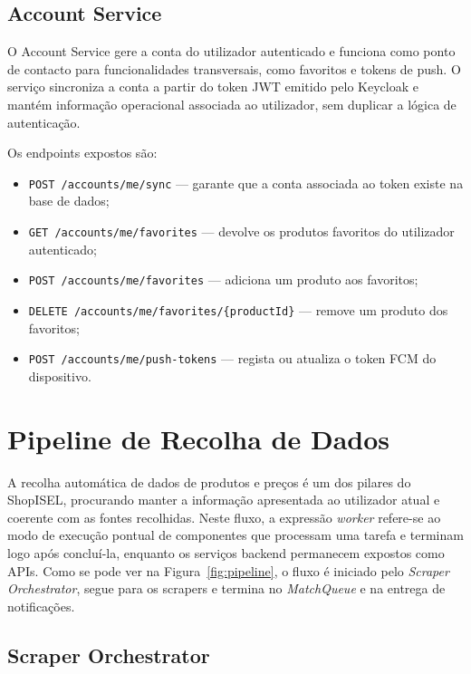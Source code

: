 \subsection{Account Service}
\label{sec:4.2.5}

O Account Service gere a conta do utilizador autenticado e funciona como ponto de contacto para funcionalidades transversais, como favoritos e tokens de push. O serviço sincroniza a conta a partir do token \ac{JWT} emitido pelo Keycloak e mantém informação operacional associada ao utilizador, sem duplicar a lógica de autenticação.

Os endpoints expostos são:
\begin{itemize}
    \item \texttt{POST /accounts/me/sync} — garante que a conta associada ao token existe na base de dados;
    \item \texttt{GET /accounts/me/favorites} — devolve os produtos favoritos do utilizador autenticado;
    \item \texttt{POST /accounts/me/favorites} — adiciona um produto aos favoritos;
    \item \texttt{DELETE /accounts/me/favorites/\{productId\}} — remove um produto dos favoritos;
    \item \texttt{POST /accounts/me/push-tokens} — regista ou atualiza o token FCM do dispositivo.
\end{itemize}

\section{Pipeline de Recolha de Dados}
\label{sec:4.3}

A recolha automática de dados de produtos e preços é um dos pilares do ShopISEL, procurando manter a informação apresentada ao utilizador atual e coerente com as fontes recolhidas. Neste fluxo, a expressão \textit{worker} refere-se ao modo de execução pontual de componentes que processam uma tarefa e terminam logo após concluí-la, enquanto os serviços backend permanecem expostos como APIs. Como se pode ver na Figura~\ref{fig:pipeline}, o fluxo é iniciado pelo \textit{Scraper Orchestrator}, segue para os scrapers e termina no \textit{MatchQueue} e na entrega de notificações.

\subsection{Scraper Orchestrator}
\label{sec:4.3.1}

